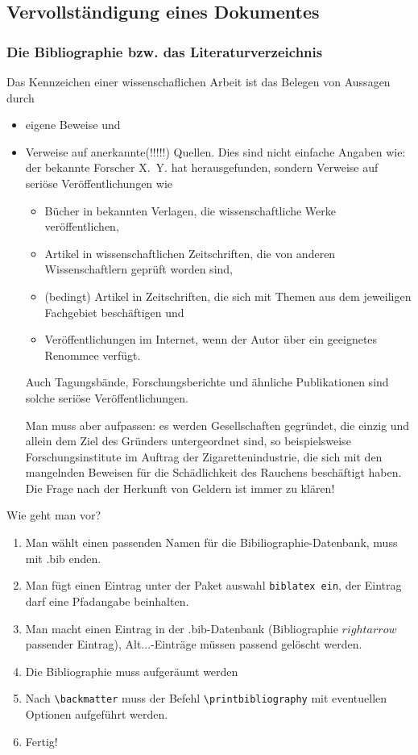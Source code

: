 \subsection{Vervollständigung eines Dokumentes}

\subsubsection{Die Bibliographie bzw. das Literaturverzeichnis}

Das Kennzeichen einer wissenschaflichen Arbeit ist das Belegen von Aussagen
durch
\begin{itemize}
  \item eigene Beweise und
  \item Verweise auf anerkannte(!!!!!) Quellen. Dies sind nicht einfache 
    Angaben wie: der bekannte Forscher X.~Y. hat herausgefunden, sondern
    Verweise auf seriöse Veröffentlichungen wie
    \begin{itemize}
      \item Bücher in bekannten Verlagen, die wissenschaftliche Werke
        veröffentlichen,
      \item Artikel in wissenschaftlichen Zeitschriften, die von anderen
        Wissenschaftlern geprüft worden sind,
      \item (bedingt) Artikel in Zeitschriften, die sich mit Themen aus dem
        jeweiligen Fachgebiet beschäftigen und
      \item Veröffentlichungen im Internet, wenn der Autor über ein 
        geeignetes Renommee verfügt.
    \end{itemize}
    Auch Tagungsbände, Forschungsberichte und ähnliche Publikationen sind 
    solche seriöse Veröffentlichungen.
    
    Man muss aber aufpassen: es werden Gesellschaften gegründet, die einzig
    und allein dem Ziel des Gründers untergeordnet sind, so beispielsweise
    Forschungsinstitute im Auftrag der Zigarettenindustrie, die sich mit
    den mangelnden Beweisen für die Schädlichkeit des Rauchens beschäftigt
    haben. Die Frage nach der Herkunft von Geldern ist immer zu klären!
\end{itemize}

Wie geht man vor?
\begin{enumerate}
  \item Man wählt einen passenden Namen für die Bibiliographie-Datenbank,
    muss mit .bib enden.
  \item Man fügt einen \lstinline||
    Eintrag unter der Paket auswahl \texttt{biblatex ein}, der Eintrag
    darf eine Pfadangabe beinhalten.
  \item Man macht einen Eintrag in der .bib-Datenbank (Bibliographie
    \(rightarrow\) passender Eintrag), Alt...-Einträge müssen passend 
    gelöscht werden.
  \item Die Bibliographie muss aufgeräumt werden
  \item Nach \lstinline|\backmatter| muss der Befehl
    \lstinline|\printbibliography| mit eventuellen Optionen aufgeführt
    werden.
  \item Fertig!
\end{enumerate}


